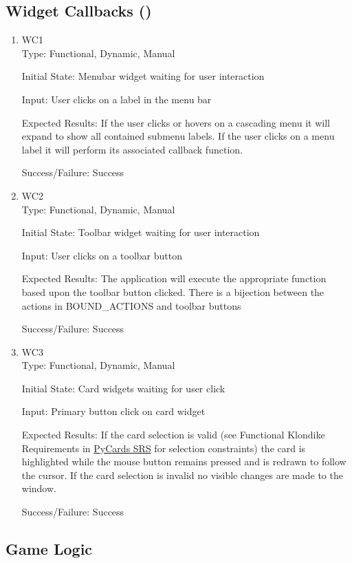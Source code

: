 \documentclass[12pt, titlepage]{article}
\begin{document}
	\subsection{Widget Callbacks ()}
	\begin{enumerate}
		\item{WC1\\}
		Type: Functional, Dynamic, Manual
		
		Initial State: Menubar widget waiting for user interaction
		
		Input: User clicks on a label in the menu bar
		
		Expected Results: If the user clicks or hovers on a cascading menu it will expand
		to show all contained submenu labels. If the user clicks on a menu label
		it will perform its associated callback function.

		Success/Failure: Success

		\item{WC2\\}
		Type: Functional, Dynamic, Manual
		
		Initial State: Toolbar widget waiting for user interaction
		
		Input: User clicks on a toolbar button
		
		Expected Results: The application will execute the appropriate function based upon
		the toolbar button clicked. There is a bijection between the actions in
		BOUND\_ACTIONS and toolbar buttons

		Success/Failure: Success

		\item{WC3\\}
		Type: Functional, Dynamic, Manual
		
		Initial State: Card widgets waiting for user click
		
		Input: Primary button click on card widget
		
		Expected Results: If the card selection is valid (see Functional Klondike Requirements in 
		\href{https://gitlab.cas.mcmaster.ca/premaa/pysol/tree/master/Doc/SRS}
		{PyCards SRS} for selection constraints) the card is highlighted while the
		mouse button remains pressed and is redrawn to follow the cursor. If the card
		selection is invalid no visible changes are made to the window.

		Success/Failure: Success
	\end{enumerate}
	\subsection{Game Logic}
	
\end{document}
